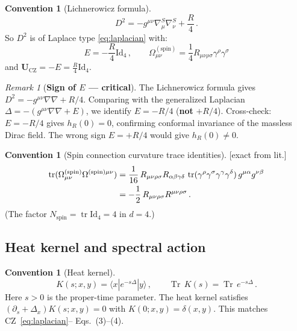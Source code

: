 \documentclass[12pt,a4paper]{article}
\theoremstyle{definition}
\newtheorem{convention}[proposition]{Convention}
\theoremstyle{remark}
\newtheorem{remark}[proposition]{Remark}
\newcommand{\Tr}{\operatorname{Tr}}
\newcommand{\tr}{\operatorname{tr}}
\newcommand{\Rsq}{R_{\mu\nu\rho\sigma}R^{\mu\nu\rho\sigma}}
\newcommand{\Id}{\mathrm{Id}}
\newcommand{\exactlit}{\textcolor{blue!60!black}{\textsf{[exact from lit.]}}}
\begin{document}
\begin{convention}[Lichnerowicz formula]
\begin{equation}
  D^2 = -g^{\mu\nu}\nabla^S_\mu\nabla^S_\nu + \frac{R}{4}\,.
  \label{eq:lichnerowicz}
\end{equation}
So $D^2$ is of Laplace type \eqref{eq:laplacian} with:
\begin{equation}
  \boxed{E = -\frac{R}{4}\Id_4\,,
  \qquad
  \Omega_{\mu\nu}^{(\text{spin})}
  = \frac{1}{4}R_{\mu\nu\rho\sigma}\gamma^\rho\gamma^\sigma}
  \label{eq:dirac-data}
\end{equation}
and $\mathbf{U}_{\text{CZ}} = -E = \frac{R}{4}\Id_4$.

\begin{remark}[\textbf{Sign of $E$ --- critical}]
\label{rem:E-sign}
The Lichnerowicz formula gives $D^2 = -g^{\mu\nu}\nabla\nabla + R/4$.
Comparing with the generalized Laplacian $\Delta = -(g^{\mu\nu}\nabla\nabla + E)$,
we identify $E = -R/4$ (\textbf{not} $+R/4$).
Cross-check: $E = -R/4$ gives $h_R(0) = 0$, confirming conformal invariance
of the massless Dirac field. The wrong sign $E = +R/4$ would give $h_R(0) \neq 0$.
\end{remark}
\end{convention}

\begin{convention}[Spin connection curvature trace identities]
\exactlit\;
\begin{align}
  \tr(\Omega_{\mu\nu}^{(\text{spin})}\Omega^{(\text{spin})\mu\nu})
  &= \frac{1}{16}\,R_{\mu\nu\rho\sigma}R_{\alpha\beta\gamma\delta}\,
    \tr(\gamma^\rho\gamma^\sigma\gamma^\gamma\gamma^\delta)\,
    g^{\mu\alpha}g^{\nu\beta}
  \notag\\
  &= -\frac{1}{2}\,\Rsq\,.
  \label{eq:OmOm-trace}
\end{align}
(The factor $N_{\text{spin}}=\tr\Id_4=4$ in $d=4$.)
\end{convention}


\subsection{Heat kernel and spectral action}

\begin{convention}[Heat kernel]
\begin{equation}
  K(s;x,y) = \langle x|e^{-s\Delta}|y\rangle\,,
  \qquad
  \Tr\, K(s) = \Tr\, e^{-s\Delta}\,.
  \label{eq:heat-kernel}
\end{equation}
Here $s > 0$ is the proper-time parameter.
The heat kernel satisfies $(\partial_s + \Delta_x)K(s;x,y)=0$
with $K(0;x,y) = \delta(x,y)$.
This matches CZ~\eqref{eq:laplacian}--\cite{CZ2012} Eqs.~(3)--(4).
\end{convention}
\end{document}
